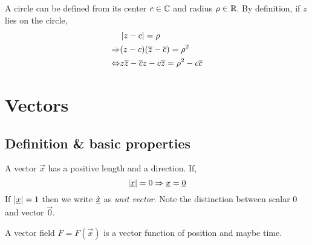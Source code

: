 \documentclass{article}
\numberwithin{equation}{section}
\begin{document}
\begin{defi}[Circle]
    A circle can be defined from its center $c \in \mathbb{C}$ and radius $\rho \in \mathbb{R}$. By definition, if $z$ lies on the circle,
    \begin{align*}
        &\left\lvert z - c\right\rvert = \rho \\
        \Rightarrow& (z - c)(\overline{z} - \overline{c}) = \rho^2 \\
        \Leftrightarrow& z\overline{z} - \overline{c}z - c\overline{z} = \rho^2 - c\overline{c}
    \end{align*}
\end{defi}


\section{Vectors}
\subsection{Definition \& basic properties}
\begin{defi}[Vector]
    A vector $\vec{x}$ has a positive length and a direction. If,
    \[
        \left\lvert \underline{x}\right\rvert = 0 \Rightarrow \underline{x} = \underline{0}  
    \]
    If $\left\lvert \underline{x}\right\rvert = 1$ then we write $\hat{\underline{x}}$ as \emph{unit vector}. Note the distinction between scalar $0$ and vector $\vec{0}$.
\end{defi}

\begin{defi}
    A vector field $F = F(\vec{x})$ is a vector function of position and maybe time.
\end{defi}
\end{document}
